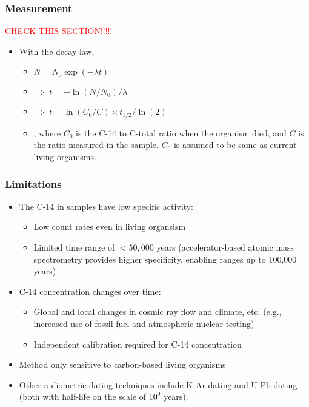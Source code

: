 \subsubsection{Measurement}
\textcolor{red}{CHECK THIS SECTION!!!!!}
\begin{itemize}
    \item With the decay law,
    \begin{itemize}
        \item[] $N=N_0\exp(-\lambda t)$
        \item[] $\Rightarrow\;t=-\ln(N/N_0)/\lambda$
        \item[] $\Rightarrow\;t=\ln(C_0/C)\times t_{1/2}/\ln(2)$
        \item[] , where $C_0$ is the C-14 to C-total ratio when the organism died, and $C$ is the ratio measured in the sample. $C_0$ is assumed to be same as current living organisms.
    \end{itemize}
\end{itemize}
\subsubsection{Limitations}
\begin{itemize}
    \item The C-14 in samples have low specific activity:
    \begin{itemize}
        \item Low count rates even in living organsism
        \item Limited time range of $<50,000$ years (accelerator-based atomic mass spectrometry provides higher specificity, enabling ranges up to 100,000 years)
    \end{itemize}
    \item C-14 concentration changes over time:
    \begin{itemize}
        \item Global and local changes in cosmic ray flow and climate, etc. (e.g., increased use of fossil fuel and atmospheric nuclear testing)
        \item Independent calibration required for C-14 concentration
    \end{itemize}
    \item Method only sensitive to carbon-based living organisms
    \item Other radiometric dating techniques include K-Ar dating and U-Pb dating (both with half-life on the scale of $10^{9}$ years).
\end{itemize}
